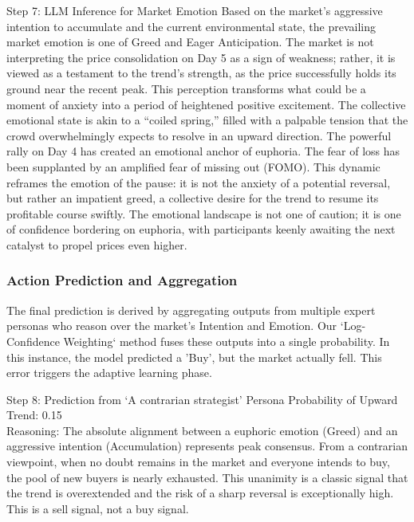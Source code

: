 \documentclass[letterpaper]{article} %
\begin{document}
\begin{forwardMainBox}{Step 7: LLM Inference for Market Emotion}
    Based on the market's aggressive intention to accumulate and the current environmental state, the prevailing market emotion is one of Greed and Eager Anticipation.
    The market is not interpreting the price consolidation on Day 5 as a sign of weakness; rather, it is viewed as a testament to the trend's strength, as the price successfully holds its ground near the recent peak. This perception transforms what could be a moment of anxiety into a period of heightened positive excitement. The collective emotional state is akin to a ``coiled spring,'' filled with a palpable tension that the crowd overwhelmingly expects to resolve in an upward direction.
    The powerful rally on Day 4 has created an emotional anchor of euphoria. The fear of loss has been supplanted by an amplified fear of missing out (FOMO). This dynamic reframes the emotion of the pause: it is not the anxiety of a potential reversal, but rather an impatient greed, a collective desire for the trend to resume its profitable course swiftly. The emotional landscape is not one of caution; it is one of confidence bordering on euphoria, with participants keenly awaiting the next catalyst to propel prices even higher.
\end{forwardMainBox}

\subsubsection*{Action Prediction and Aggregation}
The final prediction is derived by aggregating outputs from multiple expert personas who reason over the market's Intention and Emotion. Our `Log-Confidence Weighting` method fuses these outputs into a single probability. In this instance, the model predicted a 'Buy', but the market actually fell. This error triggers the adaptive learning phase.
\begin{actionBox}{Step 8: Prediction from `A contrarian strategist' Persona}
    Probability of Upward Trend: 0.15 \\
    Reasoning: The absolute alignment between a euphoric emotion (Greed) and an aggressive intention (Accumulation) represents peak consensus. From a contrarian viewpoint, when no doubt remains in the market and everyone intends to buy, the pool of new buyers is nearly exhausted. This unanimity is a classic signal that the trend is overextended and the risk of a sharp reversal is exceptionally high. This is a sell signal, not a buy signal.
\end{actionBox}
\end{document}
